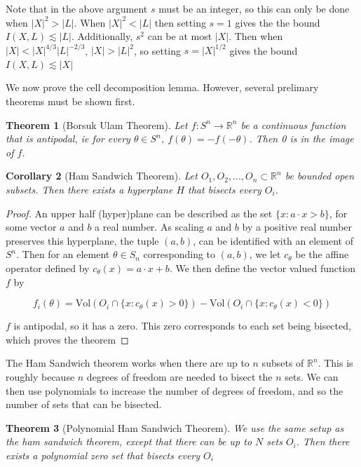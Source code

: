 \documentclass[12pt]{amsart}
\newtheorem{theorem}{Theorem}[section]
\newtheorem{Corollary}[theorem]{Corollary}
\begin{document}
 Note that in the above argument $s$ must be an integer, so this can only be done when $|X|^2 > |L|$. When $|X|^2 < |L|$ then setting $s = 1$ gives the the bound $I(X,L) \lesssim |L|$. Additionally, $s^2$ can be at most $|X|$. Then when $|X| <  |X|^{4/3} |L|^{-2/3}$, $|X| > |L|^2$, so setting $s =|X|^{1/2}$ gives the bound $I(X,L) \lesssim |X|$


We now prove the cell decomposition lemma. However, several prelimary theorems must be shown first. 

\begin{theorem}[Borsuk Ulam Theorem]
Let $f: S^n \to \mathbb{R}^n$ be a continuous function that is antipodal, ie for every $\theta \in S^n$, $f(\theta) = -f(- \theta)$. Then 0 is in the image of $f$. 
\end{theorem}

\begin{Corollary}[Ham Sandwich Theorem]
    Let $O_1, O_2, ..., O_n \subset \mathbb{R}^n$ be bounded open subsets. Then there exists a hyperplane $H$ that bisects every $O_i$. 
\end{Corollary}

\begin{proof}
An upper half (hyper)plane can be described as the set $\{x: a \cdot x > b\}$, for some vector $a$ and $b$ a real number. As scaling $a$ and $b$ by a positive real number preserves this hyperplane, the tuple $(a,b)$, can be identified with an element of $S^n$. Then for an element $\theta \in S_n$ corresponding to $(a,b)$, we let $c_\theta$ be the affine operator defined by $c_\theta(x) = a\cdot x + b$. We then define the vector valued function $f$ by

\[f_i(\theta) = \text{Vol}(O_i \cap \{x: c_\theta(x) > 0\}) - \text{Vol}(O_i \cap \{x: c_\theta(x) < 0\})\] 

$f$ is antipodal, so it has a zero. This zero corresponds to each set being bisected, which proves the theorem
\end{proof} 

The Ham Sandwich theorem works when there are up to $n$ subsets of $\mathbb{R}^n$. This is roughly because $n$ degrees of freedom are needed to bisect the $n$ sets. We can then use polynomials to increase the number of degrees of freedom, and so the number of sets that can be bisected. 

\begin{theorem}[Polynomial Ham Sandwich Theorem]
    We use the same setup as the ham sandwich theorem, except that there can be up to $N$ sets $O_i$. Then there exists a polynomial zero set that bisects every $O_i$
\end{theorem} 
\end{document}
